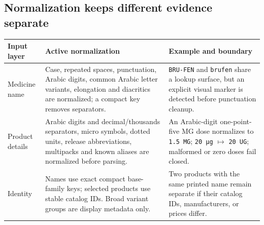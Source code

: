 \documentclass[10pt,a4paper]{article}
\newcommand{\observed}[1]{\texttt{#1}}
\begin{document}
\begin{center}
\end{center}

\subsection{Normalization keeps different evidence separate}

\begin{tabularx}{\textwidth}{@{}L{35mm}Y Y@{}}
\toprule
Input layer & Active normalization & Example and boundary \\
\midrule
Medicine name & Case, repeated spaces, punctuation, Arabic digits, common Arabic letter variants, elongation and diacritics are normalized; a compact key removes separators. & \observed{BRU-FEN} and \observed{brufen} share a lookup surface, but an explicit visual marker is detected before punctuation cleanup. \\
Product details & Arabic digits and decimal/thousands separators, micro symbols, dotted units, release abbreviations, multipacks and known aliases are normalized before parsing. & An Arabic-digit one-point-five MG dose normalizes to \observed{1.5 MG}; \observed{20 µg} $\mapsto$ \observed{20 UG}; malformed or zero doses fail closed. \\
Identity & Names use exact compact base-family keys; selected products use stable catalog IDs. Broad variant groups are display metadata only. & Two products with the same printed name remain separate if their catalog IDs, manufacturers, or prices differ. \\
\bottomrule
\end{tabularx}
\end{document}
